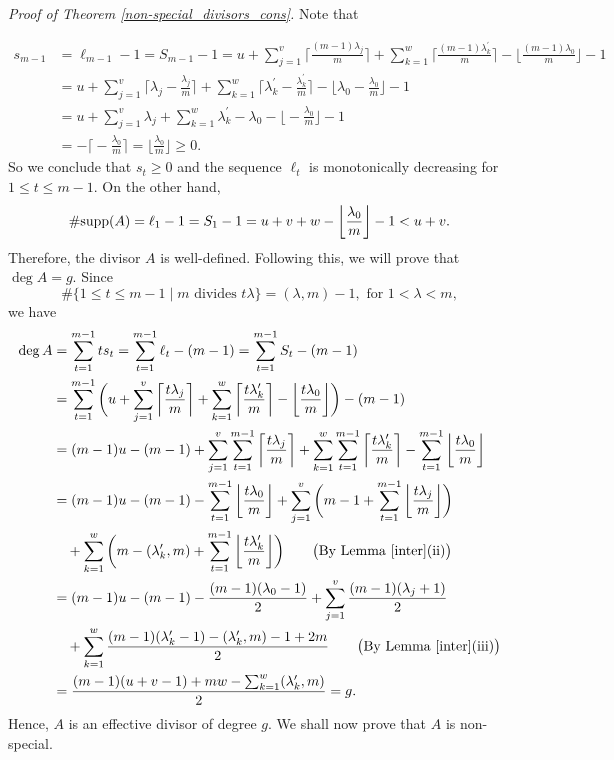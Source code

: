 \documentclass[journal,12pt,onecolumn]{IEEEtran}
\begin{document}
{
\raggedright
{\it Proof of Theorem \ref{non-special_divisors_cons}.} Note that
}
    \begin{align*}
        s_{m-1}& =\ell_{m-1}-1=S_{m-1}-1= u+\sum_{j=1}^v\bigg\lceil\frac{(m-1)\lambda_j}{m}\bigg\rceil+\sum_{k=1}^w\bigg\lceil\frac{(m-1)\lambda_k^\prime}{m}\bigg\rceil-\bigg\lfloor\frac{(m-1)\lambda_0}{m}\bigg\rfloor-1 \\
        & =u+\sum_{j=1}^v\bigg\lceil\lambda_j-\frac{\lambda_j}{m}\bigg\rceil+\sum_{k=1}^w\bigg\lceil\lambda_k^\prime-\frac{\lambda_k^\prime}{m}\bigg\rceil-\bigg\lfloor\lambda_0-\frac{\lambda_0}{m}\bigg\rfloor-1 \\
        & =u+\sum_{j=1}^v\lambda_j+\sum_{k=1}^w\lambda_k^\prime-\lambda_0-\bigg\lfloor-\frac{\lambda_0}{m}\bigg\rfloor-1 \\
        & = -\bigg\lceil-\frac{\lambda_0}{m}\bigg\rceil= \bigg\lfloor\frac{\lambda_0}{m}\bigg\rfloor\ge 0. 
    \end{align*}
    So we conclude that $s_t\ge0$ and the sequence $\ell_t$ is monotonically decreasing for $1\le t\le m-1$. On the other hand, 
    \[
        \#{\rm supp} (A)=\ell_1-1=S_1-1=u+v+w-\bigg\lfloor\frac{\lambda_0}{m}\bigg\rfloor-1< u+v.
    \]
    Therefore, the divisor $A$ is well-defined. Following this, we will prove that $\deg A=g$. Since 
    \[
        \# \{1\le t\le m-1\mid m \text{ divides } t\lambda \}=(\lambda,m)-1,\text{ for }1<\lambda<m,
    \]
    we have
    \begin{align*}
        \deg A&=\sum_{t=1}^{m-1}ts_t=\sum_{t=1}^{m-1}\ell_t-(m-1)=\sum_{t=1}^{m-1}S_t-(m-1) \\
        &=\sum_{t=1}^{m-1}\bigg(u+\sum_{j=1}^v\bigg\lceil\frac{t\lambda_j}{m}\bigg\rceil+\sum_{k=1}^w\bigg\lceil\frac{t\lambda_k^\prime}{m}\bigg\rceil-\bigg\lfloor\frac{t\lambda_0}{m}\bigg\rfloor\bigg)-(m-1) \\
        &=(m-1)u - (m-1) + \sum_{j=1}^v\sum_{t=1}^{m-1}\bigg\lceil\frac{t\lambda_j}{m}\bigg\rceil + \sum_{k=1}^w\sum_{t=1}^{m-1}\bigg\lceil\frac{t\lambda_k^\prime}{m}\bigg\rceil - \sum_{t=1}^{m-1}\bigg\lfloor\frac{t\lambda_0}{m}\bigg\rfloor \\
        &= (m-1)u - (m-1) -\sum_{t=1}^{m-1}\bigg\lfloor\frac{t\lambda_0}{m}\bigg\rfloor + \sum_{j=1}^v\bigg( m-1+\sum_{t=1}^{m-1}\bigg\lfloor\frac{t\lambda_j}{m}\bigg\rfloor \bigg) \\
        &\quad + \sum_{k=1}^w\bigg( m-(\lambda_k^\prime,m)+\sum_{t=1}^{m-1}\bigg\lfloor\frac{t\lambda_k^\prime}{m}\bigg\rfloor \bigg)\qquad\big(\text{By Lemma \ref{inter}(ii)}\big)\\
        &= (m-1)u - (m-1) - \frac{(m-1)(\lambda_0-1)}{2} + \sum_{j=1}^v\frac{(m-1)(\lambda_j+1)}{2}\\
        &\quad + \sum_{k=1}^w\frac{(m-1)(\lambda_k^\prime-1)-(\lambda_k^\prime,m)-1+2m}{2}\qquad\big(\text{By Lemma \ref{inter}(iii)}\big)\\
        &= \frac{(m-1)(u+v-1)+mw-\sum_{k=1}^w(\lambda_k^\prime,m)}{2}=g.
    \end{align*}
    Hence, $A$ is an effective divisor of degree $g$. We shall now prove that $A$ is non-special. 
\end{document}
